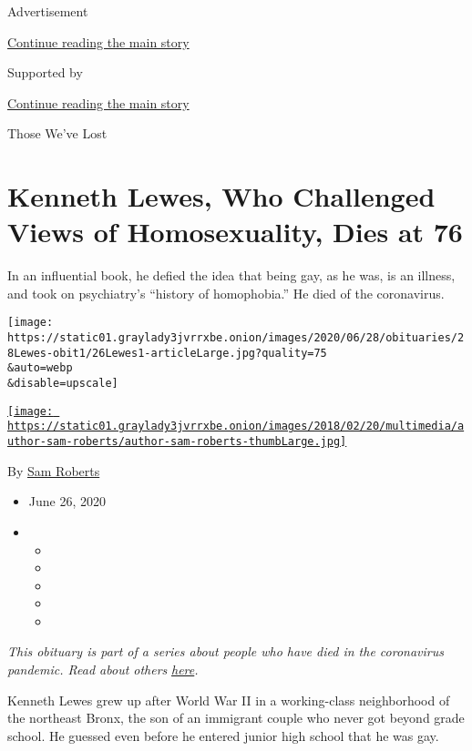 Advertisement

\protect\hyperlink{after-top}{Continue reading the main story}

Supported by

\protect\hyperlink{after-sponsor}{Continue reading the main story}

Those We've Lost

\hypertarget{kenneth-lewes-who-challenged-views-of-homosexuality-dies-at-76}{%
\section{Kenneth Lewes, Who Challenged Views of Homosexuality, Dies at
76}\label{kenneth-lewes-who-challenged-views-of-homosexuality-dies-at-76}}

In an influential book, he defied the idea that being gay, as he was, is
an illness, and took on psychiatry's ``history of homophobia.'' He died
of the coronavirus.

\texttt{[image: https://static01.graylady3jvrrxbe.onion/images/2020/06/28/obituaries/28Lewes-obit1/26Lewes1-articleLarge.jpg?quality=75\\\&auto=webp\\\&disable=upscale]}

\href{https://www.nytimes3xbfgragh.onion/by/sam-roberts}{\texttt{[image: https://static01.graylady3jvrrxbe.onion/images/2018/02/20/multimedia/author-sam-roberts/author-sam-roberts-thumbLarge.jpg]}}

By \href{https://www.nytimes3xbfgragh.onion/by/sam-roberts}{Sam Roberts}

\begin{itemize}
\item
  June 26, 2020
\item
  \begin{itemize}
  \item
  \item
  \item
  \item
  \item
  \end{itemize}
\end{itemize}

\emph{This obituary is part of a series about people who have died in
the coronavirus pandemic. Read about others}
\href{https://www.nytimes3xbfgragh.onion/interactive/2020/obituaries/people-died-coronavirus-obituaries.html}{\emph{here}}\emph{.}

Kenneth Lewes grew up after World War II in a working-class neighborhood
of the northeast Bronx, the son of an immigrant couple who never got
beyond grade school. He guessed even before he entered junior high
school that he was gay.

